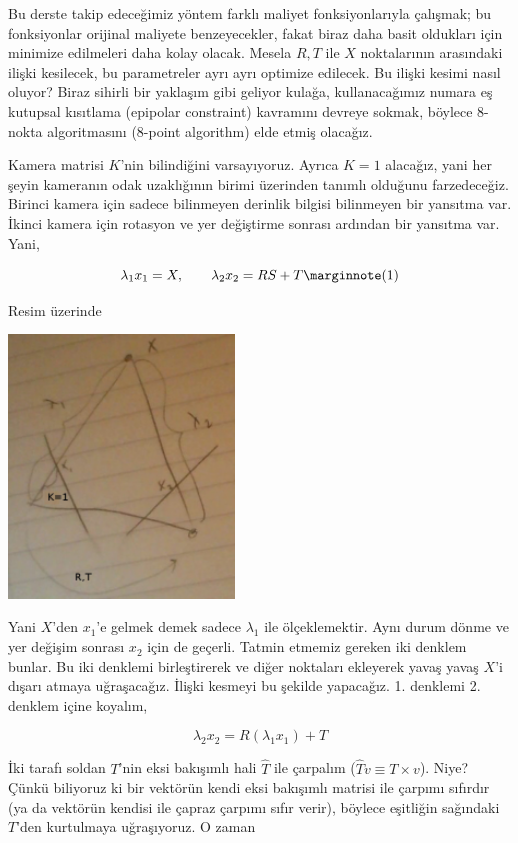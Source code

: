 \documentclass[12pt,fleqn]{article}\usepackage{../../common}
\begin{document}
Bu derste takip edeceğimiz yöntem farklı maliyet fonksiyonlarıyla çalışmak; bu
fonksiyonlar orijinal maliyete benzeyecekler, fakat biraz daha basit oldukları
için minimize edilmeleri daha kolay olacak. Mesela $R,T$ ile $X$ noktalarının
arasındaki ilişki kesilecek, bu parametreler ayrı ayrı optimize edilecek. Bu
ilişki kesimi nasıl oluyor? Biraz sihirli bir yaklaşım gibi geliyor kulağa,
kullanacağımız numara eş kutupsal kısıtlama (epipolar constraint) kavramını
devreye sokmak, böylece 8-nokta algoritmasını (8-point algorithm) elde etmiş
olacağız.

Kamera matrisi $K$'nin bilindiğini varsayıyoruz. Ayrıca $K = 1$ alacağız, yani
her şeyin kameranın odak uzaklığının birimi üzerinden tanımlı olduğunu
farzedeceğiz. Birinci kamera için sadece bilinmeyen derinlik bilgisi bilinmeyen
bir yansıtma var. İkinci kamera için rotasyon ve yer değiştirme sonrası ardından
bir yansıtma var. Yani,

$$ \lambda_1 x_1 = X, \qquad \lambda_2 x_2 = RS + T 
\mlabel{1}
$$

Resim üzerinde

\includegraphics[height=7cm]{epi2.png}

Yani $X$'den $x_1$'e gelmek demek sadece $\lambda_1$ ile ölçeklemektir.  Aynı
durum dönme ve yer değişim sonrası $x_2$ için de geçerli. Tatmin etmemiz gereken
iki denklem bunlar. Bu iki denklemi birleştirerek ve diğer noktaları ekleyerek
yavaş yavaş $X$'i dışarı atmaya uğraşacağız. İlişki kesmeyi bu şekilde
yapacağız. 1. denklemi 2. denklem içine koyalım,

$$ \lambda_2 x_2 = R(\lambda_1x_1) + T $$

İki tarafı soldan $T$'nin eksi bakışımlı hali $\hat{T}$ ile çarpalım ($\hat{T}v
\equiv T \times v$). Niye?  Çünkü biliyoruz ki bir vektörün kendi eksi bakışımlı
matrisi ile çarpımı sıfırdır (ya da vektörün kendisi ile çapraz çarpımı sıfır
verir), böylece eşitliğin sağındaki $T$'den kurtulmaya uğraşıyoruz. O zaman
\end{document}
